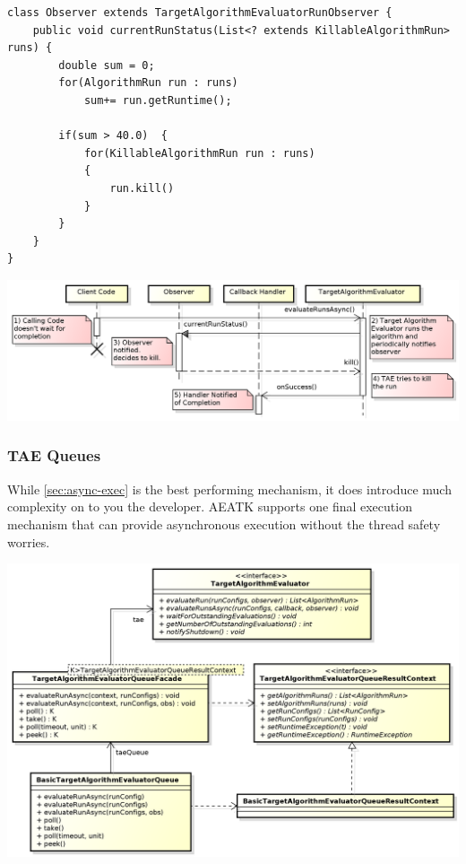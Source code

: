 \documentclass[11pt,letterpaper,oneside]{article}
\begin{document}
\begin{center}
\begin{lstlisting}[]
class Observer extends TargetAlgorithmEvaluatorRunObserver {
	public void currentRunStatus(List<? extends KillableAlgorithmRun> runs) {
		double sum = 0;
		for(AlgorithmRun run : runs)
			sum+= run.getRuntime();
		
		if(sum > 40.0)	{
			for(KillableAlgorithmRun run : runs)
			{
				run.kill()
			}
		}
	}
}

\end{lstlisting}
\end{center}




\begin{center}
\includegraphics[scale=0.5]{img/UML/TAESequence3.png}
\end{center}


\subsubsection{TAE Queues}

While \ref{sec:async-exec} is the best performing mechanism, it does introduce much complexity 
on to you the developer. AEATK supports one final execution mechanism that can provide asynchronous execution without the thread safety worries.

\begin{center}
\includegraphics[scale=0.60]{img/UML/TAEQueue.png}
\end{center}
\end{document}
